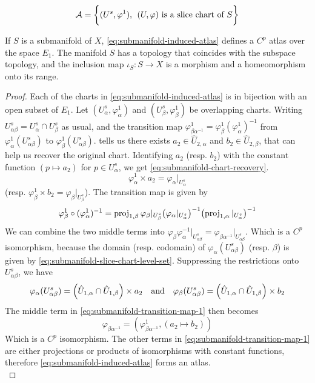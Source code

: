 \documentclass[../main-manifolds.tex]{subfiles}
\begin{document}
\begin{equation}\label{eq:submanifold-induced-atlas}
    \mathcal{A} = \biggl\{{(U^s, \varphi^1),\:\: (U,\varphi)\text{ is a slice chart of }S}\biggr\}
\end{equation}
\begin{wts}\label{prop:structure-of-submanifold}
    If $S$ is a submanifold of $X$, \cref{eq:submanifold-induced-atlas} defines a $C^p$ atlas over the space $E_1$. The manifold $S$ has a topology that coincides with the subspace topology, and the inclusion map $\iota_S: S\to X$ is a morphism and a homeomorphism onto its range.
\end{wts}
\begin{proof}
    Each of the charts in \cref{eq:submanifold-induced-atlas} is in bijection with an open subset of $E_1$. Let $(U^s_{\alpha}, \varphi^1_\alpha)$ and $(U^s_{\beta}, \varphi^1_\beta)$ be overlapping charts. Writing $U^s_{\alpha\beta} = U^s_{\alpha}\cap U^s_{\beta}$ as usual, and the transition map $\varphi^1_{\beta\alpha^{-1}} = \varphi^1_{\beta}(\varphi^1_{\alpha})^{-1}$ from $\varphi_{\alpha}^1(U_{\alpha\beta}^s)$ to $\varphi_{\beta}^1(U_{\alpha\beta}^s)$.  tells us there exists $a_2\in \hat{U}_{2,\alpha}$ and $b_2\in \hat{U}_{2,\beta}$, that can help us recover the original chart. Identifying $a_2$ (resp. $b_2$) with the constant function $(p\mapsto a_2)$ for $p\in U_{\alpha}^s$, we get \cref{eq:submanifold-chart-recovery}.
    \begin{equation}\label{eq:submanifold-chart-recovery}
    \varphi^1_{\alpha}\times a_2 = \varphi_{\alpha}\vert_{U^s_{\alpha}}
    \end{equation}
    (resp. $\varphi^1_{\beta}\times b_2 = \varphi_{\beta}\vert_{U^s_{\beta}}$). The transition map is given by
    \begin{equation}\label{eq:submanifold-transition-map-1}
    \varphi^1_{\beta}\circ (\varphi^1_{\alpha})^{-1} = \operatorname{proj}_{1,\beta}\varphi_{\beta}\vert_{U^s_{\beta}}\qty(\varphi_{\alpha}\vert_{U^s_{\alpha}})^{-1}\qty(\operatorname{proj}_{1,\alpha}\vert_{U^s_{\alpha}})^{-1}    
    \end{equation}
    We can combine the two middle terms into $\varphi_{\beta}\varphi_{\alpha}^{-1}\vert_{U^s_{\alpha\beta}}=\varphi_{\beta\alpha^{-1}}\vert_{U^s_{\alpha\beta}}$. Which is a $C^p$ isomorphism, because the domain (resp. codomain) of $\varphi_{\alpha}(U^s_{\alpha\beta})$ (resp. $\beta$) is given by \cref{eq:submanifold-slice-chart-level-set}. Suppressing the restrictions onto $U^s_{\alpha\beta}$, we have
    \[
        \varphi_{\alpha}(U^s_{\alpha\beta}) = \qty(\hat{U}_{1,\alpha}\cap\hat{U}_{1,\beta})\times a_2 \qqtext{and}\varphi_{\beta}(U^s_{\alpha\beta}) = \qty(\hat{U}_{1,\alpha}\cap\hat{U}_{1,\beta})\times b_2
    \]
    The middle term in \cref{eq:submanifold-transition-map-1} then becomes
    \[
        \varphi_{\beta\alpha^{-1}} = (\varphi^{1}_{\beta\alpha^{-1}}, (a_2\mapsto b_2))
    \]
    Which is a $C^p$ isomorphism. The other terms in \cref{eq:submanifold-transition-map-1} are either projections or products of isomorphisms with constant functions, therefore \cref{eq:submanifold-induced-atlas} forms an atlas.\\


\end{proof}
\end{document}
